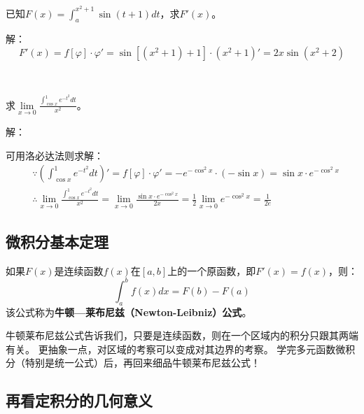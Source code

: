 ~

\begin{example}
已知$F\left( x \right) =\int_a^{x^2+1}{\sin \left( t+1 \right) dt}$，求$F'\left( x \right) $。
\end{example}

解：
\[
F'\left( x \right) =f\left[ \varphi \right] \cdot \varphi '=\sin \left[ \left( x^2+1 \right) +1 \right] \cdot \left( x^2+1 \right) '=2x\sin \left( x^2+2 \right)
\]

~

\begin{example}
求$\underset{x\rightarrow 0}{\lim}\frac{\int_{\cos x}^1{e^{-t^2}dt}}{x^2}$。
\end{example}

解：

可用洛必达法则求解：
\begin{align*}
&\because \left( \int_{\cos x}^1{e^{-t^2}dt} \right) '=f\left[ \varphi \right] \cdot \varphi '=-e^{-\cos ^2x}\cdot \left( -\sin x \right) =\sin x\cdot e^{-\cos ^2x} \\
&\therefore \underset{x\rightarrow 0}{\lim}\frac{\int_{\cos x}^1{e^{-t^2}dt}}{x^2}=\underset{x\rightarrow 0}{\lim}\frac{\sin x\cdot e^{-\cos ^2x}}{2x}=\frac{1}{2}\underset{x\rightarrow 0}{\lim}e^{-\cos ^2x}=\frac{1}{2e}
\end{align*}

\subsection{微积分基本定理}

\begin{theorem}[微积分基本定理]
如果$F\left( x \right) $是连续函数$f\left( x \right) $在$\left[ a,b \right] $上的一个原函数，即$F'\left( x \right) =f\left( x \right) $，则：
\[
\int_a^b{f\left( x \right) dx}=F\left( b \right) -F\left( a \right)
\]
该公式称为{\bf 牛顿—莱布尼兹（Newton-Leibniz）公式}。
\end{theorem}

牛顿莱布尼兹公式告诉我们，只要是连续函数，则在一个区域内的积分只跟其两端有关。
更抽象一点，对区域的考察可以变成对其边界的考察。
学完多元函数微积分（特别是统一公式）后，再回来细品牛顿莱布尼兹公式！

\subsection{再看定积分的几何意义}

